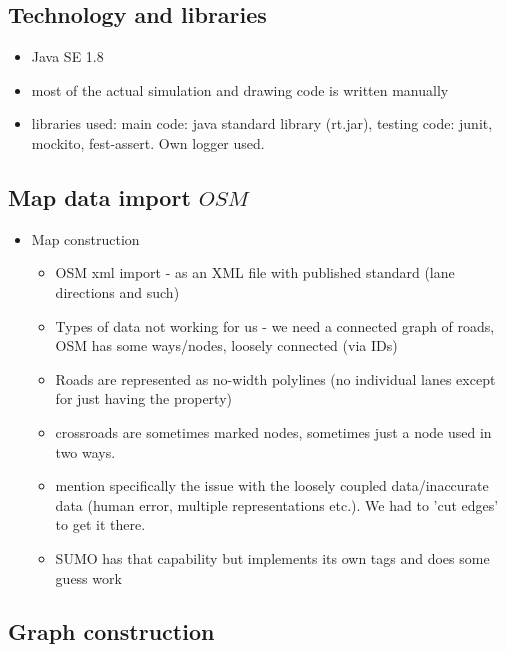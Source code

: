 \subsection{Technology and libraries}
\begin{itemize}
    \item Java SE 1.8
    \item most of the actual simulation and drawing code is written manually
    \item libraries used: main code: java standard library (rt.jar), testing code: junit, mockito, fest-assert. Own logger used.
\end{itemize}


\subsection{Map data import \(OSM\)}
\begin{itemize}
    \item Map construction
    \begin{itemize}
        \item OSM xml import - as an XML file with published standard (lane directions and such)
        \item Types of data not working for us - we need  a connected graph of roads, OSM has some ways/nodes, loosely  connected (via IDs)
        \item Roads are represented as no-width polylines (no individual lanes except for just having the property)
        \item crossroads are sometimes marked nodes, sometimes just a node used in two ways.
        \item mention specifically the issue with the loosely coupled data/inaccurate data (human error, multiple representations etc.). We had to 'cut edges' to get it there.
        \item SUMO has that capability but implements its own tags and does some guess work
    \end{itemize}
\end{itemize}

\subsection{Graph construction}

